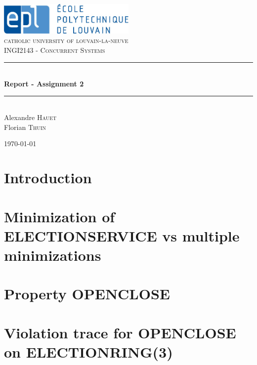 \documentclass[fleqn]{article}
\newcommand{\HRule}{\rule{\linewidth}{0.5mm}}
\begin{document}
\begin{titlepage}

\begin{center}


\includegraphics[width=0.5\textwidth]{epl-logo.jpg}\\[1cm]

\textsc{\LARGE catholic university of louvain-la-neuve}\\[1.5cm]

\textsc{\Large INGI2143 - Concurrent Systems}\\[0.5cm]


\HRule \\[0.4cm]
{ \huge \bfseries Report - Assignment 2}\\[0.4cm]

\HRule \\[1.5cm]


{\huge Alexandre \textsc{Hauet} \\[0.6cm] Florian \textsc{Thuin}}


\vfill

{\large \today}

\end{center}

\end{titlepage}


\section{Introduction}



\section{Minimization of ELECTIONSERVICE vs multiple minimizations}



\newpage
\section{Property OPENCLOSE}



\section{Violation trace for OPENCLOSE on ELECTIONRING(3)}
\end{document}
